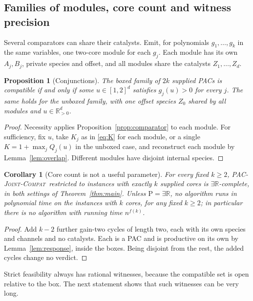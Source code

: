 \documentclass[11pt,a4paper]{article}
\theoremstyle{plain}
\newtheorem{proposition}[theorem]{Proposition}
\newtheorem{corollary}[theorem]{Corollary}
\theoremstyle{definition}
\theoremstyle{remark}
\newcommand{\ER}{\exists\mathbb{R}}
\newcommand{\R}{\mathbb{R}}
\newcommand{\PJC}{\textup{\textsc{PAC-Joint-Compat}}}
\begin{document}
\subsection{Families of modules, core count and witness precision}

Several comparators can share their catalysts. Emit, for polynomials $g_1,\ldots,g_k$ in the same variables, one two-core module for each $g_j$. Each module has its own $A_j,B_j$, private species and offset, and all modules share the catalysts $Z_1,\ldots,Z_d$.

\begin{proposition}[Conjunctions]\label{prop:conjunction}
The boxed family of $2k$ supplied PACs is compatible if and only if some $u\in[1,2]^d$ satisfies $g_j(u)>0$ for every $j$. The same holds for the unboxed family, with one offset species $Z_0$ shared by all modules and $u\in\R^d_{>0}$.
\end{proposition}

\begin{proof}
Necessity applies Proposition~\ref{prop:comparator} to each module. For sufficiency, fix $u$, take $K_j$ as in \eqref{eq:K} for each module, or a single $K=1+\max_jQ_j(u)$ in the unboxed case, and reconstruct each module by Lemma~\ref{lem:overlap}. Different modules have disjoint internal species.
\end{proof}

\begin{corollary}[Core count is not a useful parameter]\label{cor:count}
For every fixed $k\ge2$, \PJC\ restricted to instances with exactly $k$ supplied cores is $\ER$-complete, in both settings of Theorem~\ref{thm:main}. Unless $\mathrm P=\ER$, no algorithm runs in polynomial time on the instances with $k$ cores, for any fixed $k\ge2$; in particular there is no algorithm with running time $n^{f(k)}$.
\end{corollary}

\begin{proof}
Add $k-2$ further gain-two cycles of length two, each with its own species and channels and no catalysts. Each is a PAC and is productive on its own by Lemma~\ref{lem:response}, inside the boxes. Being disjoint from the rest, the added cycles change no verdict.
\end{proof}

Strict feasibility always has rational witnesses, because the compatible set is open relative to the box. The next statement shows that such witnesses can be very long.
\end{document}
